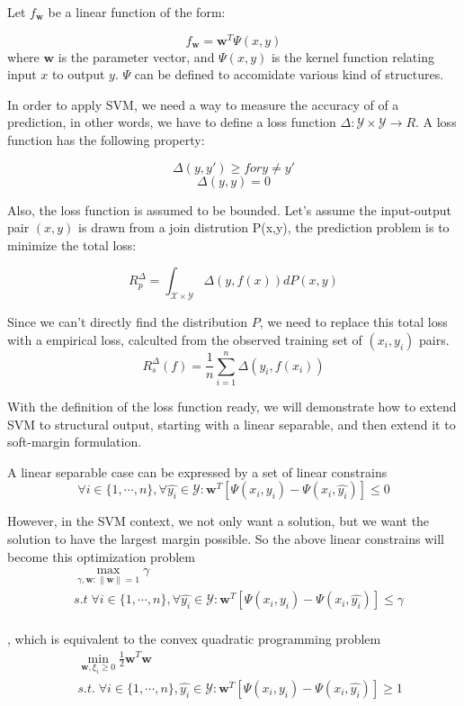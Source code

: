 Let $f_{\mathbf{w}}$ be a linear function of the form:

$$ f_{\mathbf{w}} = \mathbf{w}^{T}\Psi(x,y)$$
where $\mathbf{w}$ is the parameter vector, and $\Psi(x,y)$ is the kernel function relating input $x$ to output $y$. $\Psi$ can be defined to accomidate various kind of structures. 

In order to apply SVM, we need a way to measure the accuracy of of a prediction, in other words, we have to define a loss function $\Delta:\mathcal{Y}\times\mathcal{Y}\rightarrow R$. A loss function has the following property:

$$\Delta(y, y') \geq for y \neq y'$$
$$\Delta(y, y) = 0 $$

Also, the loss function is assumed to be bounded. Let's assume the input-output pair $(x,y)$ is drawn from a join distrution P(x,y), the prediction problem is to minimize the total loss:

$$R_p^\Delta = \int_{\mathcal{X} \times \mathcal{Y}} \Delta (y, f(x))dP(x,y)$$

Since we can't directly find the distribution $P$, we need to replace this total loss with a empirical loss, calculted from the observed training set of $(x_i, y_i)$ pairs.
$$R_s^\Delta(f) = \frac{1}{n}\sum^n_{i=1}\Delta(y_i, f(x_i))$$

With the definition of the loss function ready, we will demonstrate how to extend SVM to structural output, starting with a linear separable, and then extend it to soft-margin formulation. 

A linear separable case can be expressed by a set of linear constrains
$$\forall i \in \{1,\cdots,n\}, \forall \hat{y_i}\in\mathcal{Y}: \mathbf{w}^T [\Psi(x_i, y_i) - \Psi(x_i, \hat{y_i})]\leq 0$$

However, in the SVM context, we not only want a solution, but we want the solution to have the largest margin possible. So the above linear constrains will become this optimization problem
$$
\begin{aligned}
& \max_{\gamma, \mathbf{w}:\|\mathbf{w}\| = 1} \gamma \\
& s.t \; \forall i \in \{1,\cdots,n\}, \forall \hat{y_i} \in\mathcal{Y}: \mathbf{w}^T [\Psi(x_i, y_i) - \Psi(x_i, \hat{y_i})] \leq \gamma\\
\end{aligned}
$$

, which is equivalent to the convex quadratic programming problem
$$
\begin{aligned}
   & \min_{\mathbf{w}, \xi_i \geq 0} \frac{1}{2}\mathbf{w}^T\mathbf{w} \\\
    &s.t.\; \forall i \in \{1,\cdots,n\},\hat{y_i} \in \mathcal{Y}: \mathbf{w}^T[\Psi(x_i,y_i) - \Psi(x_i,\hat{y_i})] \geq 1\\
\end{aligned}
$$

